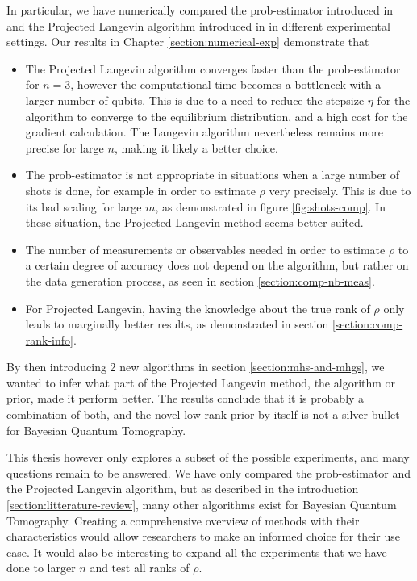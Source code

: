 \documentclass[12pt]{memoir}
\begin{document}
In particular, we have numerically compared the prob-estimator introduced in \cite{MA17} and the Projected Langevin algorithm introduced in \cite{meth:bayesian:Langevin:ACMT2024} in different experimental settings. Our results in Chapter \ref{section:numerical-exp} demonstrate that 
\begin{itemize}
    \item The Projected Langevin algorithm converges faster than the prob-estimator for $n=3$, however the computational time becomes a bottleneck with a larger number of qubits. This is due to a need to reduce the stepsize $\eta$ for the algorithm to converge to the equilibrium distribution, and a high cost for the gradient calculation. The Langevin algorithm nevertheless remains more precise for large $n$, making it likely a better choice.
    \item The prob-estimator is not appropriate in situations when a large number of shots is done, for example in order to estimate $\rho$ very precisely. This is due to its bad scaling for large $m$, as demonstrated in figure \ref{fig:shots-comp}. In these situation, the Projected Langevin method seems better suited.
    \item The number of measurements or observables needed in order to estimate $\rho$ to a certain degree of accuracy does not depend on the algorithm, but rather on the data generation process, as seen in section \ref{section:comp-nb-meas}.
    \item For Projected Langevin, having the knowledge about the true rank of $\rho$ only leads to marginally better results, as demonstrated in section \ref{section:comp-rank-info}.
\end{itemize}
By then introducing 2 new algorithms in section \ref{section:mhs-and-mhgs}, we wanted to infer what part of the Projected Langevin method, the algorithm or prior, made it perform better. The results conclude that it is probably a combination of both, and the novel low-rank prior by itself is not a silver bullet for Bayesian Quantum Tomography.\medbreak 

This thesis however only explores a subset of the possible experiments, and many questions remain to be answered. We have only compared the prob-estimator and the Projected Langevin algorithm, but as described in the introduction \ref{section:litterature-review}, many other algorithms exist for Bayesian Quantum Tomography. Creating a comprehensive overview of methods with their characteristics would allow researchers to make an informed choice for their use case. It would also be interesting to expand all the experiments that we have done to larger $n$ and test all ranks of $\rho$. \medbreak
\end{document}
